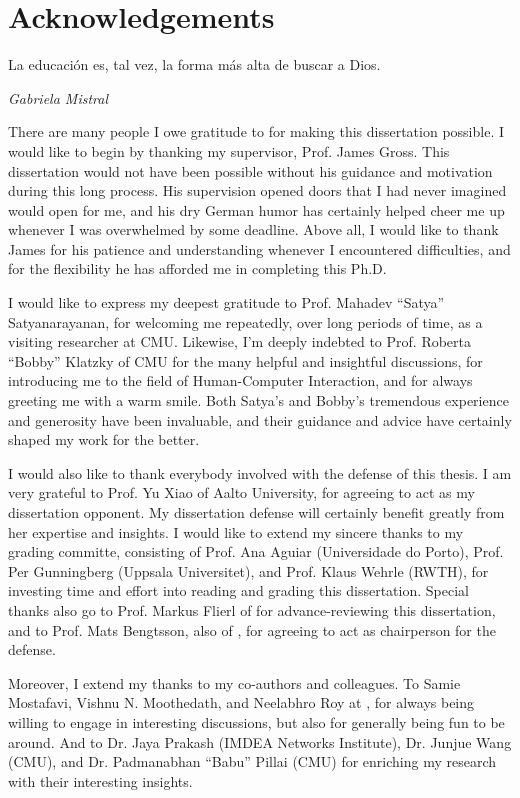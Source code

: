 \chapter{Acknowledgements}
\epigraph{La educación es, tal vez, la forma más alta de buscar a Dios.}{\emph{Gabriela Mistral}}
\glsresetall%

There are many people I owe gratitude to for making this dissertation possible.
I would like to begin by thanking my supervisor, Prof. James Gross.
This dissertation would not have been possible without his guidance and motivation during this long process.
His supervision opened doors that I had never imagined would open for me, and his dry German humor has certainly helped cheer me up whenever I was overwhelmed by some deadline.
Above all, I would like to thank James for his patience and understanding whenever I encountered difficulties, and for the flexibility he has afforded me in completing this Ph.D.

I would like to express my deepest gratitude to Prof. Mahadev ``Satya'' Satyanarayanan, for welcoming me repeatedly, over long periods of time, as a visiting researcher at \gls{CMU}.
Likewise, I'm deeply indebted to Prof. Roberta ``Bobby'' Klatzky of \gls{CMU} for the many helpful and insightful discussions, for introducing me to the field of Human-Computer Interaction, and for always greeting me with a warm smile.
Both Satya's and Bobby's tremendous experience and generosity have been invaluable, and their guidance and advice have certainly shaped my work for the better.

I would also like to thank everybody involved with the defense of this thesis.
I am very grateful to Prof. Yu Xiao of Aalto University, for agreeing to act as my dissertation opponent.
My dissertation defense will certainly benefit greatly from her expertise and insights.
I would like to extend my sincere thanks to my grading committe, consisting of Prof. Ana Aguiar (Universidade do Porto), Prof. Per Gunningberg (Uppsala Universitet), and Prof. Klaus Wehrle (\gls{RWTH}), for investing time and effort into reading and grading this dissertation.
Special thanks also go to Prof. Markus Flierl of  for advance-reviewing this dissertation, and to Prof. Mats Bengtsson, also of , for agreeing to act as chairperson for the defense.

Moreover, I extend my thanks to my co-authors and colleagues.
To Samie Mostafavi, Vishnu N. Moothedath, and Neelabhro Roy at , for always being willing to engage in interesting discussions, but also for generally being fun to be around.
And to Dr. Jaya Prakash (IMDEA Networks Institute), Dr. Junjue Wang (\gls{CMU}), and Dr. Padmanabhan ``Babu'' Pillai (\gls{CMU}) for enriching my research with their interesting insights.

